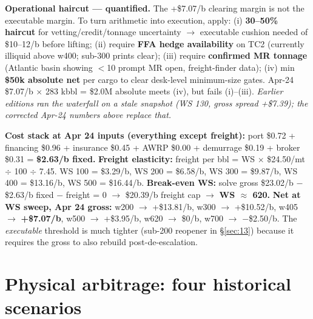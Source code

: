 \documentclass[10pt,a4paper]{article}
\begin{document}
\begin{callout}
\smallskip
\textbf{Operational haircut --- quantified.} The +\$7.07/b clearing margin is not the executable margin. To turn arithmetic into execution, apply: (i) \textbf{30--50\% haircut} for vetting/credit/tonnage uncertainty $\rightarrow$ executable cushion needed of \$10--12/b before lifting; (ii) require \textbf{FFA hedge availability} on TC2 (currently illiquid above w400; sub-300 prints clear); (iii) require \textbf{confirmed MR tonnage} (Atlantic basin showing $<$10 prompt MR open, freight-finder data); (iv) min \textbf{\$50k absolute net} per cargo to clear desk-level minimum-size gates. Apr-24 \$7.07/b $\times$ 283 kbbl = \$2.0M absolute meets (iv), but fails (i)--(iii). \emph{Earlier editions ran the waterfall on a stale snapshot (WS 130, gross spread +\$7.39); the corrected Apr-24 numbers above replace that.}
\end{callout}

\vspace{0.2cm}
\begin{callout}
\footnotesize
\textbf{Cost stack at Apr 24 inputs (everything except freight):} port \$0.72 + financing \$0.96 + insurance \$0.45 + AWRP \$0.00 + demurrage \$0.19 + broker \$0.31 = \textbf{\$2.63/b fixed.} \textbf{Freight elasticity:} freight per bbl = WS $\times$ \$24.50/mt $\div$ 100 $\div$ 7.45. WS 100 = \$3.29/b, WS 200 = \$6.58/b, WS 300 = \$9.87/b, WS 400 = \$13.16/b, WS 500 = \$16.44/b. \textbf{Break-even WS:} solve gross \$23.02/b $-$ \$2.63/b fixed $-$ freight = 0 $\rightarrow$ \$20.39/b freight cap $\rightarrow$ \textbf{WS $\approx$ 620.} \textbf{Net at WS sweep, Apr 24 gross:} w200 $\rightarrow$ +\$13.81/b, w300 $\rightarrow$ +\$10.52/b, w405 $\rightarrow$ \textbf{+\$7.07/b}, w500 $\rightarrow$ +\$3.95/b, w620 $\rightarrow$ \$0/b, w700 $\rightarrow$ $-$\$2.50/b. The \emph{executable} threshold is much tighter (sub-200 reopener in \S\ref{sec:13}) because it requires the gross to also rebuild post-de-escalation.
\end{callout}

\newpage

\section{Physical arbitrage: four historical scenarios}\label{sec:12}
\end{document}
